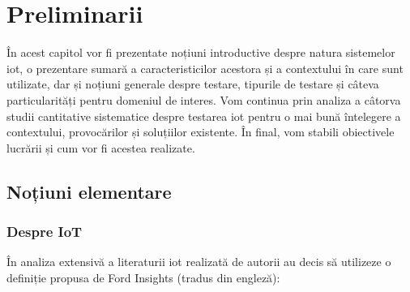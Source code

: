 \chapter{Preliminarii}

În acest capitol vor fi prezentate noțiuni introductive despre natura sistemelor \acrfull{iot}, o prezentare sumară a caracteristicilor acestora și a contextului în care sunt utilizate, dar și noțiuni generale despre testare, tipurile de testare și câteva particularități pentru domeniul de interes. Vom continua prin analiza a câtorva studii cantitative sistematice despre testarea \acrshort{iot} pentru o mai bună întelegere a contextului, provocărilor și soluțiilor existente. În final, vom stabili obiectivele lucrării și cum vor fi acestea realizate.


\section{Noțiuni elementare}

\subsection{Despre IoT}


În analiza extensivă a literaturii \acrshort{iot} realizată de \cite{Nord2019} autorii au decis să utilizeze o definiție propusa de Ford Insights \cite{insight2017internet} (tradus din engleză):


